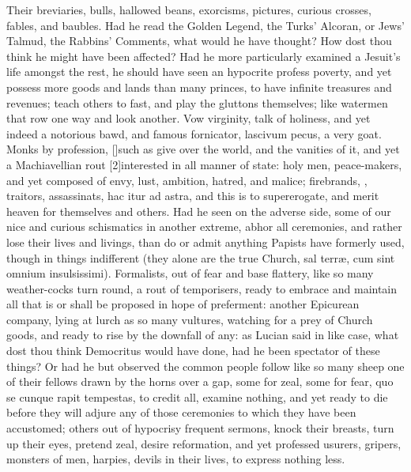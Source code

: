 {Their breviaries, bulls, hallowed beans, exorcisms, pictures, curious
crosses, fables, and baubles. Had he read the Golden Legend, the Turks'
Alcoran, or Jews' Talmud, the Rabbins' Comments, what would he have
thought? How dost thou think he might have been affected? Had he more
particularly examined a Jesuit's life amongst the rest, he should have
seen an hypocrite profess poverty, and yet possess more goods and
lands than many princes, to have infinite treasures and revenues; teach
others to fast, and play the gluttons themselves; like watermen that
row one way and look another. Vow virginity, talk of holiness, and
yet indeed a notorious bawd, and famous fornicator, lascivum pecus, a
very goat. Monks by profession, [\baselineskip]such as give over the world, and
the vanities of it, and yet a Machiavellian rout [2\baselineskip]interested in all
manner of state: holy men, peace-makers, and yet composed of envy,
lust, ambition, hatred, and malice; firebrands, ,
traitors, assassinats, hac itur ad astra, and this is to supererogate,
and merit heaven for themselves and others. Had he seen on the adverse
side, some of our nice and curious schismatics in another extreme,
abhor all ceremonies, and rather lose their lives and livings, than do
or admit anything Papists have formerly used, though in things
indifferent (they alone are the true Church, sal terr\ae{}, cum sint
omnium insulsissimi). Formalists, out of fear and base flattery, like
so many weather-cocks turn round, a rout of temporisers, ready to
embrace and maintain all that is or shall be proposed in hope of
preferment: another Epicurean company, lying at lurch as so many
vultures, watching for a prey of Church goods, and ready to rise by the
downfall of any: as Lucian said in like case, what dost thou think
Democritus would have done, had he been spectator of these things?
Or had he but observed the common people follow like so many sheep one
of their fellows drawn by the horns over a gap, some for zeal, some for
fear, quo se cunque rapit tempestas, to credit all, examine nothing,
and yet ready to die before they will adjure any of those ceremonies to
which they have been accustomed; others out of hypocrisy frequent
sermons, knock their breasts, turn up their eyes, pretend zeal, desire
reformation, and yet professed usurers, gripers, monsters of men,
harpies, devils in their lives, to express nothing less.

}
